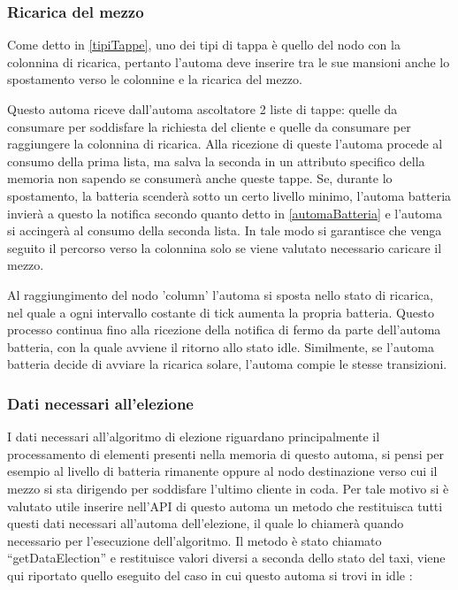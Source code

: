 \subsubsection{Ricarica del mezzo} \label{tappe colonnina}
Come detto in \ref{tipiTappe}, uno dei tipi di tappa è quello del nodo con la colonnina di ricarica, pertanto l'automa deve inserire tra le sue mansioni anche lo spostamento verso le colonnine e la ricarica del mezzo.

Questo automa riceve dall'automa ascoltatore 2 liste di tappe: quelle da consumare per soddisfare la richiesta del cliente e quelle da consumare per raggiungere la colonnina di ricarica. Alla ricezione di queste l'automa procede al consumo della prima lista, ma salva la seconda in un attributo specifico della memoria non sapendo se consumerà anche queste tappe. Se, durante lo spostamento, la batteria scenderà sotto un certo livello minimo, l'automa batteria invierà a questo la notifica secondo quanto detto in \ref{automaBatteria} e l'automa si accingerà al consumo della seconda lista. 
In tale modo si garantisce che venga seguito il percorso verso la colonnina solo se viene valutato necessario caricare il mezzo.

Al raggiungimento del nodo 'column' l'automa si sposta nello stato di ricarica, nel quale a ogni intervallo costante di tick aumenta la propria batteria. Questo processo continua fino alla ricezione della notifica di fermo da parte dell'automa batteria, con la quale avviene il ritorno allo stato idle.
Similmente, se l'automa batteria decide di avviare la ricarica solare, l'automa compie le stesse transizioni.

\subsubsection{Dati necessari all'elezione} \label{getDataElection}
I dati necessari all'algoritmo di elezione riguardano principalmente il processamento di elementi presenti nella memoria di questo automa, si pensi per esempio al livello di batteria rimanente oppure al nodo destinazione verso cui il mezzo si sta dirigendo per soddisfare l'ultimo cliente in coda.
Per tale motivo si è valutato utile inserire nell'API di questo automa un metodo che restituisca tutti questi dati necessari all'automa dell'elezione, il quale lo chiamerà quando necessario per l'esecuzione dell'algoritmo. Il metodo è stato chiamato ``getDataElection'' e restituisce valori diversi a seconda dello stato del taxi, viene qui riportato quello eseguito del caso in cui questo automa si trovi in idle :

